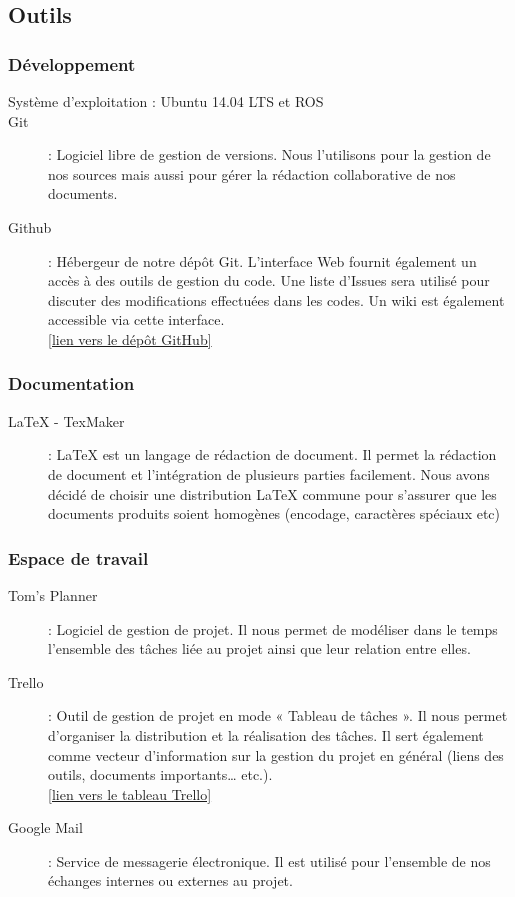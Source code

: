 \documentclass[10pt,a4paper]{article}
\begin{document}
\subsection{Outils}

\subsubsection{Développement}
\begin{description}
\item [Système d'exploitation : Ubuntu 14.04 LTS et ROS]
\item [Git] : Logiciel libre de gestion de versions. Nous l'utilisons pour la gestion de nos sources mais aussi pour gérer la rédaction collaborative de nos documents.
\item [Github] : Hébergeur de notre dépôt Git. L'interface Web fournit également un accès à des outils de gestion du code. Une liste d'Issues sera utilisé pour discuter des modifications effectuées dans les codes. Un wiki est également accessible via cette interface.\\ \href{https://github.com/Projet-M2-TurtleBot-UPS}{[lien vers le dépôt GitHub]} 
\end{description}

\subsubsection{Documentation}
\begin{description}
\item [LaTeX - TexMaker] : LaTeX est un langage de rédaction de document. Il permet la rédaction de document et l'intégration de plusieurs parties facilement. Nous avons décidé de choisir une distribution LaTeX commune pour s'assurer que les documents produits soient homogènes (encodage, caractères spéciaux etc)
\end{description}

\subsubsection{Espace de travail}
\begin{description}
\item [Tom's Planner] : Logiciel de gestion de projet. Il nous permet de modéliser dans le temps l'ensemble des tâches liée au projet ainsi que leur relation entre elles.
\item [Trello] : Outil de gestion de projet en mode « Tableau de tâches ». Il nous permet d'organiser la distribution et la réalisation des tâches. Il sert également comme vecteur d'information sur la gestion du projet en général (liens des outils, documents importants… etc.).\\ \href{https://trello.com/projetturtlebot}{[lien vers le tableau Trello]}
\item [Google Mail] : Service de messagerie électronique. Il est utilisé pour l’ensemble de nos échanges internes ou externes au projet.
\end{description}
 
\end{document}
